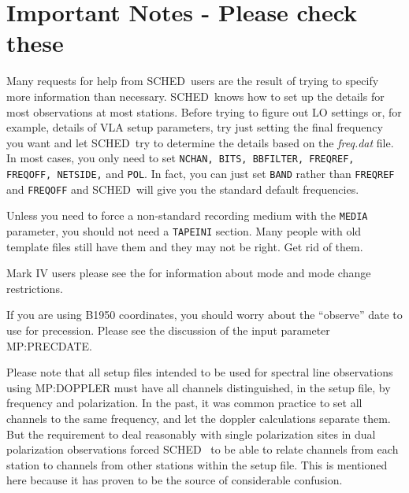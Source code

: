 \documentclass{report}
\newcommand{\schedb}{{\sc SCHED~}}
\begin{document}
\tableofcontents

\section{\label{SEC:NOTES} Important Notes - Please check these}

\begin{list}{}{\parsep 0.5em \itemsep 0.5em }

\item Many requests for help from \schedb users are the result of trying
to specify more information than necessary.  \schedb knows how to set up
the details for most observations at most stations.  Before trying to
figure out LO settings or, for example, details of VLA setup parameters,
try just setting the final frequency you want and let \schedb try to
determine the details based on the {\sl freq.dat} file.  In most cases,
you only need to set {\tt NCHAN, BITS, BBFILTER, FREQREF, FREQOFF,
NETSIDE,} and {\tt POL}.  In fact, you can just set {\tt BAND} rather
than {\tt FREQREF} and {\tt FREQOFF} and \schedb will give you the
standard default frequencies.

\item Unless you need to force a non-standard recording medium with
the {\tt MEDIA} parameter, you should not need a {\tt TAPEINI}
section.  Many people with old template files still have them and they
may not be right.  Get rid of them.

\item Mark IV users please see the 
for information about mode and mode change restrictions.

\item If you are using B1950 coordinates, you should worry
about the ``observe'' date to use for precession.  Please see the
discussion of the input parameter 
{MP:PRECDATE}.

\item Please note that all setup files intended to be used for
spectral line observations using  {MP:DOPPLER}
must have all channels distinguished, in the setup file, by frequency
and polarization.  In the past, it was common practice to set all
channels to the same frequency, and let the doppler calculations
separate them.  But the requirement to deal reasonably with single
polarization sites in dual polarization observations forced \schedb
to be able to relate channels from each station to channels from
other stations within the setup file.  This is mentioned here because
it has proven to be the source of considerable confusion.


\end{list}
\end{document}
